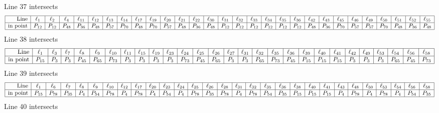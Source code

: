 \documentclass{article}
\begin{document}
{$$$$
Line 37 intersects 
$$
\begin{array}{|r*{28}{|c}|}
\hline
\mbox{Line}  & \ell_{1} & \ell_{2} & \ell_{4} & \ell_{11} & \ell_{12} & \ell_{13} & \ell_{14} & \ell_{17} & \ell_{19} & \ell_{20} & \ell_{21} & \ell_{22} & \ell_{30} & \ell_{31} & \ell_{32} & \ell_{33} & \ell_{34} & \ell_{35} & \ell_{36} & \ell_{42} & \ell_{43} & \ell_{45} & \ell_{46} & \ell_{49} & \ell_{50} & \ell_{51} & \ell_{52} & \ell_{55}\\
\hline
\mbox{in point}  & P_{12} & P_{12} & P_{48} & P_{36} & P_{48} & P_{57} & P_{70} & P_{48} & P_{70} & P_{57} & P_{48} & P_{36} & P_{48} & P_{12} & P_{12} & P_{12} & P_{12} & P_{12} & P_{12} & P_{48} & P_{36} & P_{70} & P_{57} & P_{57} & P_{70} & P_{48} & P_{36} & P_{48}\\
\hline
\end{array}
$$
Line 38 intersects 
$$
\begin{array}{|r*{27}{|c}|}
\hline
\mbox{Line}  & \ell_{1} & \ell_{3} & \ell_{7} & \ell_{8} & \ell_{9} & \ell_{10} & \ell_{11} & \ell_{15} & \ell_{19} & \ell_{23} & \ell_{24} & \ell_{25} & \ell_{26} & \ell_{27} & \ell_{31} & \ell_{32} & \ell_{35} & \ell_{36} & \ell_{39} & \ell_{40} & \ell_{41} & \ell_{42} & \ell_{49} & \ell_{53} & \ell_{54} & \ell_{56} & \ell_{58}\\
\hline
\mbox{in point}  & P_{15} & P_{3} & P_{3} & P_{45} & P_{65} & P_{73} & P_{3} & P_{3} & P_{3} & P_{3} & P_{73} & P_{45} & P_{65} & P_{3} & P_{3} & P_{65} & P_{73} & P_{45} & P_{15} & P_{15} & P_{15} & P_{3} & P_{3} & P_{3} & P_{65} & P_{45} & P_{73}\\
\hline
\end{array}
$$
Line 39 intersects 
$$
\begin{array}{|r*{28}{|c}|}
\hline
\mbox{Line}  & \ell_{1} & \ell_{6} & \ell_{7} & \ell_{8} & \ell_{9} & \ell_{10} & \ell_{12} & \ell_{17} & \ell_{20} & \ell_{23} & \ell_{24} & \ell_{25} & \ell_{26} & \ell_{28} & \ell_{31} & \ell_{32} & \ell_{35} & \ell_{36} & \ell_{38} & \ell_{40} & \ell_{41} & \ell_{43} & \ell_{48} & \ell_{50} & \ell_{53} & \ell_{54} & \ell_{56} & \ell_{58}\\
\hline
\mbox{in point}  & P_{15} & P_{78} & P_{35} & P_{4} & P_{54} & P_{78} & P_{4} & P_{78} & P_{4} & P_{54} & P_{4} & P_{78} & P_{35} & P_{78} & P_{4} & P_{78} & P_{54} & P_{35} & P_{15} & P_{15} & P_{15} & P_{4} & P_{78} & P_{4} & P_{78} & P_{4} & P_{54} & P_{35}\\
\hline
\end{array}
$$
Line 40 intersects 
$$
\begin{array}{|r*{28}{|c}|}

\end{array}$$}
\end{document}
